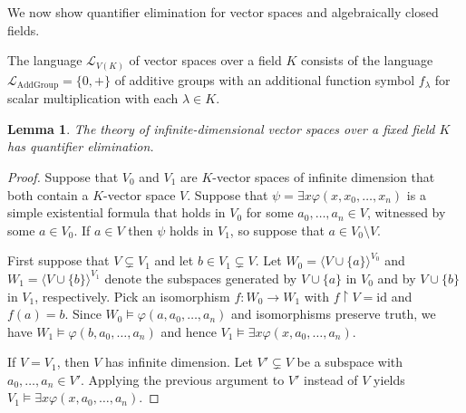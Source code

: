 \documentclass[a4paper, 11pt]{amsart}
\newtheorem{lemma}[lemma]{Lemma}
\theoremstyle{remark}
\newcommand{\cL}{\mathcal L}
\begin{document}


We now show quantifier elimination for vector spaces and algebraically closed fields. 

The language $\cL_{V(K)}$ of vector spaces over a field $K$ consists of the language $\cL_{\mathrm{AddGroup}}=\{0,+ \}$ of additive groups with an additional function symbol $f_\lambda$ for scalar multiplication with each $\lambda\in K$. 

\begin{lemma} \label{quantifier elimination for infinite-dimensional vector spaces} 
The theory of infinite-dimensional vector spaces over a fixed field $K$ has quantifier elimination. 
\end{lemma} 
\begin{proof} 
Suppose that $V_0$ and $V_1$ are $K$-vector spaces of infinite dimension that both contain a $K$-vector space $V$. 
Suppose that $\psi=\exists x \varphi(x,x_0,\dots,x_n)$ is a simple existential formula that holds in $V_0$ for some $a_0,\dots,a_n\in V$, witnessed by some $a\in V_0$. If $a\in V$ then $\psi$ holds in $V_1$, so suppose that $a\in V_0\setminus V$. 

First suppose that $V \subsetneq V_1$ and let $b\in V_1 \subsetneq V$. 
Let $W_0=\langle V\cup \{a\}\rangle^{V_0}$ and $W_1=\langle V\cup \{b\}\rangle^{V_1}$ denote the subspaces generated by $V\cup \{a\}$ in $V_0$ and by $V\cup \{b\}$ in $V_1$, respectively. 
Pick an isomorphism $f\colon W_0\rightarrow W_1$ with $f{\upharpoonright}V=\mathrm{id}$ and $f(a)=b$. 
Since $W_0\models \varphi(a,a_0,\dots,a_n)$ and isomorphisms preserve truth, we have $W_1\models \varphi(b,a_0,\dots,a_n)$ and hence $V_1\models \exists x \varphi(x,a_0,\dots,a_n)$. 

If $V=V_1$, then $V$ has infinite dimension. 
Let $V'\subsetneq V$ be a subspace with $a_0,\dots,a_n\in V'$. 
Applying the previous argument to $V'$ instead of $V$ yields $V_1\models \exists x \varphi(x,a_0,\dots,a_n)$. 
\end{proof} 
\end{document}
